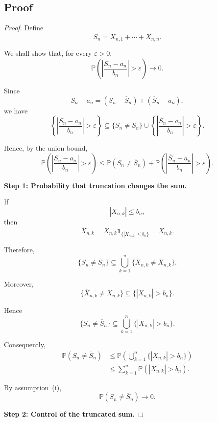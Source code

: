 \subsection{Proof}

\begin{proof}

Define
\[
\overline{S}_n
=
\overline{X}_{n,1}
+\cdots+
\overline{X}_{n,n}.
\]

We shall show that, for every $\varepsilon>0$,
\[
\mathbb{P}
\left(
\left|
\frac{S_n-a_n}{b_n}
\right|
>\varepsilon
\right)
\longrightarrow0.
\]

Since
\[
S_n-a_n
=
(S_n-\overline{S}_n)
+
(\overline{S}_n-a_n),
\]
we have
\[
\left\{
\left|
\frac{S_n-a_n}{b_n}
\right|
>\varepsilon
\right\}
\subseteq
\{S_n\neq\overline{S}_n\}
\cup
\left\{
\left|
\frac{\overline{S}_n-a_n}{b_n}
\right|
>\varepsilon
\right\}.
\]

Hence, by the union bound,
\begin{equation}
\mathbb{P}
\left(
\left|
\frac{S_n-a_n}{b_n}
\right|
>\varepsilon
\right)
\leq
\mathbb{P}(S_n\neq\overline{S}_n)
+
\mathbb{P}
\left(
\left|
\frac{\overline{S}_n-a_n}{b_n}
\right|
>\varepsilon
\right).
\tag{1}
\end{equation}

\medskip

\noindent
\textbf{Step 1: Probability that truncation changes the sum.}

If
\[
|X_{n,k}|\leq b_n,
\]
then
\[
\overline{X}_{n,k}
=
X_{n,k}
\mathbf{1}_{\{|X_{n,k}|\leq b_n\}}
=
X_{n,k}.
\]

Therefore,
\[
\{S_n\neq\overline{S}_n\}
\subseteq
\bigcup_{k=1}^n
\{\overline{X}_{n,k}\neq X_{n,k}\}.
\]

Moreover,
\[
\{\overline{X}_{n,k}\neq X_{n,k}\}
\subseteq
\{|X_{n,k}|>b_n\}.
\]

Hence
\[
\{S_n\neq\overline{S}_n\}
\subseteq
\bigcup_{k=1}^n
\{|X_{n,k}|>b_n\}.
\]

Consequently,
\[
\begin{aligned}
\mathbb{P}(S_n\neq\overline{S}_n)
&\leq
\mathbb{P}
\left(
\bigcup_{k=1}^n
\{|X_{n,k}|>b_n\}
\right)\\
&\leq
\sum_{k=1}^n
\mathbb{P}(|X_{n,k}|>b_n).
\end{aligned}
\]

By assumption~\textnormal{(i)},
\[
\boxed{
\mathbb{P}(S_n\neq\overline{S}_n)
\longrightarrow0.
}
\tag{2}
\]

\medskip

\noindent
\textbf{Step 2: Control of the truncated sum.}


\end{proof}
